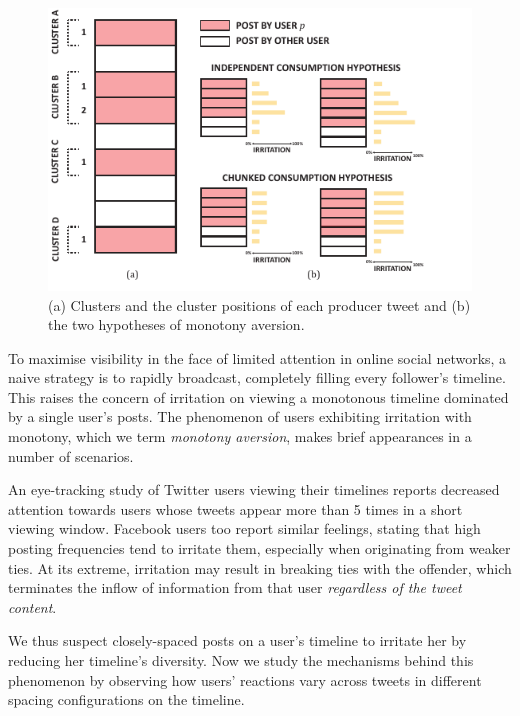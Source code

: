 \documentclass[onesided,letterpaper]{tufte-book}
\begin{document}
\begin{figure}
  \includegraphics[width=\linewidth]{monotony.pdf}
  \caption[Notation and hypotheses of monotony aversion.]{(a) Clusters and the cluster positions of each producer tweet and (b) the two hypotheses of monotony aversion.}
  \label{fig:monotony}
\end{figure}

To maximise visibility in the face of limited attention in online social networks, a naive strategy is to rapidly broadcast, completely filling every follower's timeline. This raises the concern of irritation on viewing a monotonous timeline dominated by a single user's posts. The phenomenon of users exhibiting irritation with monotony, which we term \textit{monotony aversion}, makes brief appearances in a number of scenarios.

An eye-tracking study of Twitter users viewing their timelines\cite{counts2011taking} reports decreased attention towards users whose tweets appear more than 5 times in a short viewing window. Facebook users too report similar feelings\cite{koroleva2011cognition}, stating that high posting frequencies tend to irritate them, especially when originating from weaker ties. At its extreme, irritation may result in breaking ties with the offender, which terminates the inflow of information from that user \textit{regardless of the tweet content}\cite{kwak2011fragile}.

We thus suspect closely-spaced posts on a user's timeline to irritate her by reducing her timeline's diversity. Now we study the mechanisms behind this phenomenon by observing how users' reactions vary across tweets in different spacing configurations on the timeline.
\end{document}
